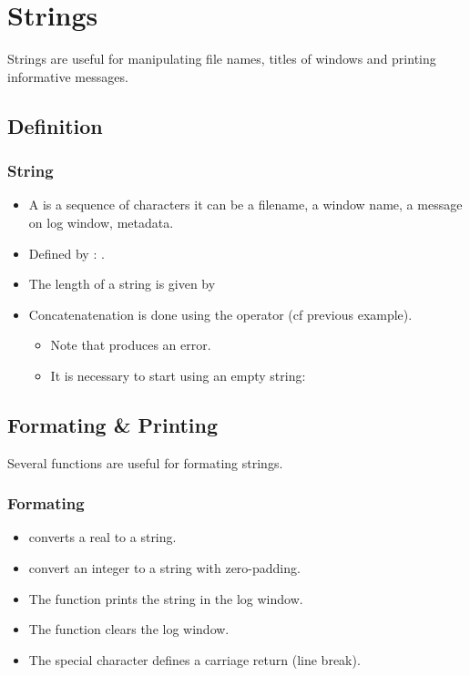 \section{Strings}

Strings are useful for manipulating file names, titles of windows and printing
informative messages.

\subsection{Definition}
\begin{frame}[fragile]
  \frametitle<presentation>{String}
  \begin{itemize}
  \item A  is a sequence of characters it can be a
    filename, a window name, a message on log window, metadata.
  \item Defined by : .
  \item The length of a string is given by 
  \item Concatenatenation is done using the operator \code{+} (cf previous example).
    \begin{itemize}
    \item Note that  produces an error.
    \item It is necessary to start using an empty string: 
    \end{itemize}
  \end{itemize}
\end{frame}

\subsection{Formating \& Printing}

Several functions are useful for formating strings.

\begin{frame}[fragile]
  \frametitle<presentation>{Formating}
  \begin{itemize}
  \item {} converts a real to a string.
  \item {} convert an integer to a string with zero-padding.
  \item The function  prints the string in the log window.
  \item The function  clears the log window.
  \item The special character  defines a carriage return (line break).
  \end{itemize}
\end{frame}

